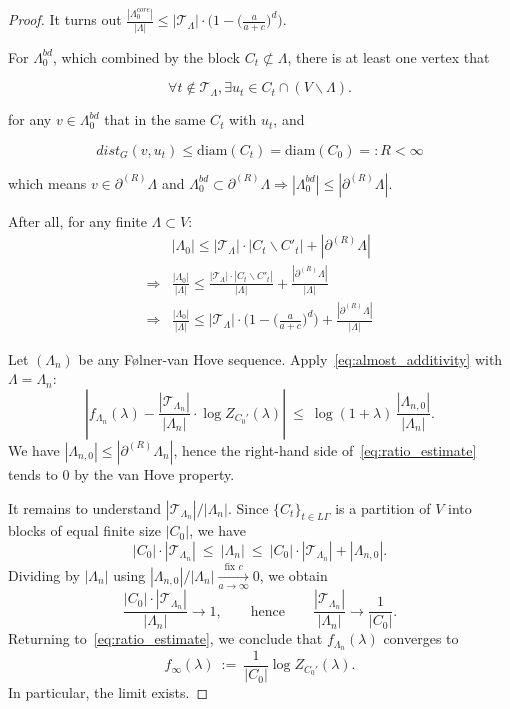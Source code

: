\documentclass[a4paper,11pt]{article}
\theoremstyle{plain}
\theoremstyle{definition}
\theoremstyle{remark}
\newcommand{\1}{\mathbf{1}}
\begin{document}
\begin{proof}
It turns out $\frac{|\Lambda_0^{core}|}{|\Lambda|}\le|\mathcal{T}_\Lambda|\cdot\bigl(1-\bigl(\frac{a}{a+c}\bigr)^d\bigr)$.

For $\Lambda^{bd}_0$, which combined by the block $C_t\not\subset\Lambda$, there is at least one vertex that

\begin{equation}
    \forall t\notin\mathcal{T}_\Lambda, \exists u_t\in C_t\cap(V\backslash\Lambda).
\end{equation}

for any $v\in\Lambda^{bd}_0$ that in the same $C_t$ with $u_t$, and

\begin{equation}
    dist_G(v, u_t)\le\mathrm{diam}(C_t)=\mathrm{diam}(C_0)=:R<\infty
\end{equation}

which means $v\in\partial^{(R)}\Lambda$ and $\Lambda^{bd}_0\subset\partial^{(R)}\Lambda\Rightarrow |\Lambda^{bd}_0|\le|\partial^{(R)}\Lambda|$.

After all, for any finite $\Lambda\subset V$:
\begin{align}
    &|\Lambda_0|\le|\mathcal{T}_\Lambda|\cdot |C_t\backslash C'_t|+|\partial^{(R)}\Lambda|\\
    \Rightarrow&\frac{|\Lambda_0|}{|\Lambda|}\le\frac{|\mathcal{T}_\Lambda|\cdot |C_t\backslash C'_t|}{|\Lambda|}+\frac{|\partial^{(R)}\Lambda|}{|\Lambda|}\\
    \Rightarrow&\frac{|\Lambda_0|}{|\Lambda|}\le|\mathcal{T}_\Lambda|\cdot\bigl(1-\bigl(\frac{a}{a+c}\bigr)^d\bigr)+\frac{|\partial^{(R)}\Lambda|}{|\Lambda|}
\end{align}

Let $(\Lambda_n)$ be any Følner-van Hove sequence. Apply~\eqref{eq:almost_additivity} with $\Lambda=\Lambda_n$:
\begin{equation}\label{eq:ratio_estimate}
\left|
f_{\Lambda_n}(\lambda)
-
\frac{|\mathcal{T}_{\Lambda_n}|}{|\Lambda_n|}\cdot \log Z_{C_0'}(\lambda)
\right|
\ \le\
\log(1+\lambda)\,\frac{|\Lambda_{n,0}|}{|\Lambda_n|}.
\end{equation}
We have $|\Lambda_{n,0}|\le |\partial^{(R)}\Lambda_n|$, hence the
right-hand side of~\eqref{eq:ratio_estimate} tends to $0$ by the van Hove property.

It remains to understand $|\mathcal{T}_{\Lambda_n}|/|\Lambda_n|$. Since $\{C_t\}_{t\in L\Gamma}$ is a partition
of $V$ into blocks of equal finite size $|C_0|$, we have
\[
|C_0|\cdot |\mathcal{T}_{\Lambda_n}|
\ \le\
|\Lambda_n|
\ \le\
|C_0|\cdot |\mathcal{T}_{\Lambda_n}| + |\Lambda_{n,0}|.
\]
Dividing by $|\Lambda_n|$ using $|\Lambda_{n,0}|/|\Lambda_n|\xrightarrow[a\to\infty]{\text{fix $c$}} 0$, we obtain
\[
\frac{|C_0|\cdot |\mathcal{T}_{\Lambda_n}|}{|\Lambda_n|}\longrightarrow 1,
\qquad\text{hence}\qquad
\frac{|\mathcal{T}_{\Lambda_n}|}{|\Lambda_n|}\longrightarrow \frac{1}{|C_0|}.
\]
Returning to~\eqref{eq:ratio_estimate}, we conclude that $f_{\Lambda_n}(\lambda)$ converges to
\[
f_\infty(\lambda)\ :=\ \frac{1}{|C_0|}\log Z_{C_0'}(\lambda).
\]
In particular, the limit exists.


\end{proof}
\end{document}
